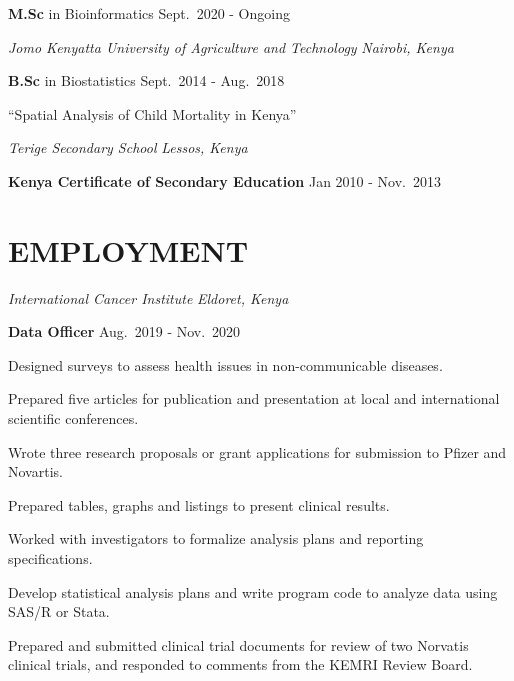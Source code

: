 \documentclass[13pt,]{article}
\providecommand{\tightlist}{%
  \setlength{\itemsep}{0pt}\setlength{\parskip}{0pt}}
\renewenvironment{itemize}{
  \begin{list}{}{
    \setlength{\leftmargin}{1.5em}
  }
}{
  \end{list}
}
\begin{document}
\begin{itemize}
\tightlist
\item
  \textbf{M.Sc} in Bioinformatics \hfill Sept.~2020 - Ongoing
\end{itemize}

\emph{Jomo Kenyatta University of Agriculture and Technology}
\hfill \emph{Nairobi, Kenya}

\begin{itemize}
\item
  \textbf{B.Sc} in Biostatistics \hfill Sept.~2014 - Aug.~2018

  \begin{itemize}
  \tightlist
  \item
    ``Spatial Analysis of Child Mortality in Kenya''
  \end{itemize}
\end{itemize}

\emph{Terige Secondary School} \hfill \emph{Lessos, Kenya}

\begin{itemize}
\tightlist
\item
  \textbf{Kenya Certificate of Secondary Education} \hfill Jan 2010 -
  Nov.~2013
\end{itemize}

\hypertarget{employment}{%
\section{\texorpdfstring{\textbf{EMPLOYMENT}}{EMPLOYMENT}}\label{employment}}

\emph{International Cancer Institute} \hfill \emph{Eldoret, Kenya}

\textbf{Data Officer} \hfill Aug.~2019 - Nov.~2020

\begin{itemize}
\tightlist
\item
  Designed surveys to assess health issues in non-communicable diseases.
\item
  Prepared five articles for publication and presentation at local and
  international scientific conferences.
\item
  Wrote three research proposals or grant applications for submission to
  Pfizer and Novartis.
\item
  Prepared tables, graphs and listings to present clinical results.
\item
  Worked with investigators to formalize analysis plans and reporting
  specifications.
\item
  Develop statistical analysis plans and write program code to analyze
  data using SAS/R or Stata.
\item
  Prepared and submitted clinical trial documents for review of two
  Norvatis clinical trials, and responded to comments from the KEMRI
  Review Board.
\end{itemize}
\end{document}
